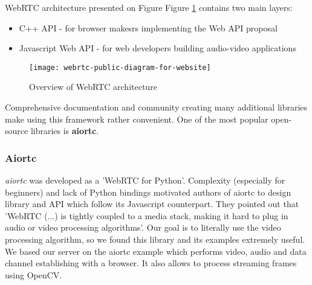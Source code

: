 \documentclass[../Main.tex]{subfiles}
\begin{document}
    WebRTC architecture presented on Figure Figure \ref{fig:webrtc-public-diagram-for-website} contains two main layers: 
    \begin{itemize}
    \item C++ API - for browser makesrs implementing the Web API proposal
    \item Javascript Web API - for web developers building audio-video applications \\
    \end{itemize}
    
    \begin{figure}[h]
    \centering
    \texttt{[image: webrtc-public-diagram-for-website]}
    \caption{Overview of WebRTC architecture}
    \label{fig:webrtc-public-diagram-for-website}
    \end{figure}

    Comprehensive documentation and community creating many additional libraries make using this framework rather convenient. One of the most popular open-source libraries is \textbf{aiortc}.
    
    \subsubsection{Aiortc}
    \textit{aiortc} was developed as a 'WebRTC for Python'. Complexity (especially for beginners) and lack of Python bindings motivated authors of aiortc to design library and API which follow its Javascript counterpart. They pointed out that  'WebRTC (...) is tightly coupled to a media stack, making it hard to plug in audio or video processing algorithms'. Our goal is to literally use the video processing algorithm, so we found this library and its examples extremely useful.
    We based our server on the aiortc example which performs video, audio and data channel establishing with a browser. It also allows to process streaming frames using OpenCV. 
    
\end{document}
